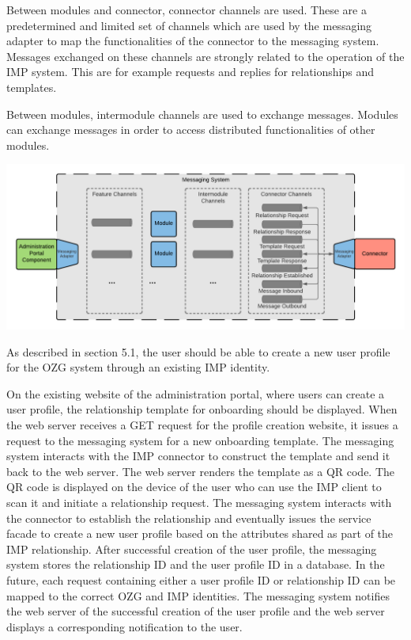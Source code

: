 Between modules and connector, connector channels are used. These are a predetermined and limited set of channels which are used by the messaging adapter to map the functionalities of the connector to the messaging system. Messages exchanged on these channels are strongly related to the operation of the IMP system. This are for example requests and replies for relationships and templates.

Between modules, intermodule channels are used to exchange messages. Modules can exchange messages in order to access distributed functionalities of other modules.

\begin{center}
    \includegraphics[scale=0.6]{Diagrams/Integration Architecture 1/Technological Integration/4. Messaging Overview.pdf}
\end{center}


As described in section 5.1, the user should be able to create a new user profile for the OZG system through an existing IMP identity.

On the existing website of the administration portal, where users can create a user profile, the relationship template for onboarding should be displayed. When the web server receives a GET request for the profile creation website, it issues a request to the messaging system for a new onboarding template. The messaging system interacts with the IMP connector to construct the template and send it back to the web server. The web server renders the template as a QR code. The QR code is displayed on the device of the user who can use the IMP client to scan it and initiate a relationship request. The messaging system interacts with the connector to establish the relationship and eventually issues the service facade to create a new user profile based on the attributes shared as part of the IMP relationship. After successful creation of the user profile, the messaging system stores the relationship ID and the user profile ID in a database. In the future, each request containing either a user profile ID or relationship ID can be mapped to the correct OZG and IMP identities. The messaging system notifies the web server of the successful creation of the user profile and the web server displays a corresponding notification to the user.

